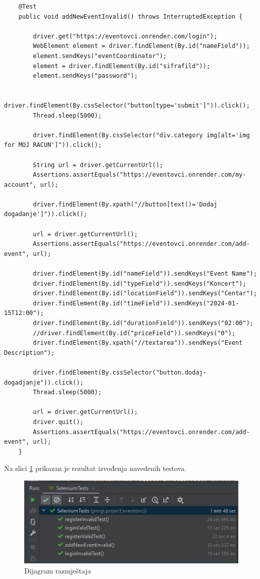 \begin{lstlisting}
	@Test
	public void addNewEventInvalid() throws InterruptedException {
		
		driver.get("https://eventovci.onrender.com/login");
		WebElement element = driver.findElement(By.id("nameField"));
		element.sendKeys("eventCoordinator");
		element = driver.findElement(By.id("sifrafild"));
		element.sendKeys("password");
		
		driver.findElement(By.cssSelector("button[type='submit']")).click();
		Thread.sleep(5000);
		
		driver.findElement(By.cssSelector("div.category img[alt='img for MOJ RACUN']")).click();
		
		String url = driver.getCurrentUrl();
		Assertions.assertEquals("https://eventovci.onrender.com/my-account", url);
		
		driver.findElement(By.xpath("//button[text()='Dodaj dogadanje']")).click();
		
		url = driver.getCurrentUrl();
		Assertions.assertEquals("https://eventovci.onrender.com/add-event", url);
		
		driver.findElement(By.id("nameField")).sendKeys("Event Name");
		driver.findElement(By.id("typeField")).sendKeys("Koncert");
		driver.findElement(By.id("locationField")).sendKeys("Centar");
		driver.findElement(By.id("timeField")).sendKeys("2024-01-15T12:00");
		driver.findElement(By.id("durationField")).sendKeys("02:00");
		//driver.findElement(By.id("priceField")).sendKeys("0");
		driver.findElement(By.xpath("//textarea")).sendKeys("Event Description");
				
		driver.findElement(By.cssSelector("button.dodaj-dogadjanje")).click();
		Thread.sleep(5000);
		
		url = driver.getCurrentUrl();
		driver.quit();
		Assertions.assertEquals("https://eventovci.onrender.com/add-event", url);
	}
\end{lstlisting}

			Na slici \ref{sust} prikazan je rezultat izvođenja navedenih testova.

			\begin{figure}[H]
				\includegraphics[width=\textwidth]{slike/ispitivanje_sustava.jpeg} 
				\centering
				\vspace{-0.2cm}
				\caption{Dijagram razmještaja}
				\label{sust}
			\end{figure}
			
